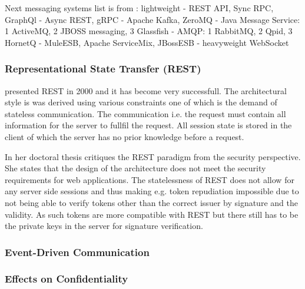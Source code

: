 \begin{sloppypar}
\begin{sloppypar}
    Next messaging systems list is from \citep{secchalmsa}:
lightweight
-
    REST API,
    Sync RPC,
    GraphQl
    -
    Async REST,
    gRPC
    - 
    Apache Kafka,
    ZeroMQ
    -
    Java Message Service:
    1 ActiveMQ,
    2 JBOSS messaging,
    3 Glassfish
    -
    AMQP:
    1 RabbitMQ,
    2 Qpid,
    3 HornetQ
    -
    MuleESB,
    Apache ServiceMix,
    JBossESB
-
heavyweight
    WebSocket
\end{sloppypar}

\subsubsection{Representational State Transfer (REST)}
\begin{sloppypar}
    \citet{restroy} presented REST in 2000 and it has become very successfull. 
    The architectural style is was derived using various constraints one of 
    which is the demand of stateless communication. The communication i.e. 
    the request must contain all information for the server to fullfil the request. 
    All session state is stored in the client of which the server has no prior 
    knowledge before a request.
\end{sloppypar}
\begin{sloppypar}
    In her doctoral thesis \citet{secchalmsa} critiques the REST paradigm from 
    the security perspective. She states that the design of the architecture 
    does not meet the security requirements for web applications. The 
    statelessness of REST does not allow for any server side sessions and thus 
    making e.g. token repudiation impossible due to not being able to verify 
    tokens other than the correct issuer by signature and the validity. As such 
    tokens are more compatible with REST but there still has to be the private 
    keys in the server for signature verification.
\end{sloppypar}

\subsubsection{Event-Driven Communication}
\begin{sloppypar}
    
\end{sloppypar}

\subsubsection{Effects on Confidentiality}
\begin{sloppypar}
    

\end{sloppypar}
\end{sloppypar}
